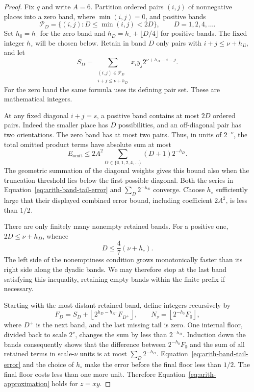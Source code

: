 \begin{proof}
Fix $q$ and write $A=6$.  Partition ordered pairs $(i,j)$ of
nonnegative places into a zero band, where $\min(i,j)=0$, and
positive bands
\[
 \mathcal P_D=\{(i,j):D\leq\min(i,j)<2D\},
 \qquad D=1,2,4,\ldots.
\]
Set $h_0=h_\circ$ for the zero band and
$h_D=h_\circ+\lfloor D/4\rfloor$ for positive bands.  The fixed
integer $h_\circ$ will be chosen below.  Retain in band $D$ only
pairs with $i+j\leq \nu+h_D$, and let
\begin{equation}
 S_D=\sum_{\substack{(i,j)\in\mathcal P_D\\i+j\leq \nu+h_D}}
           x_i y_j2^{\nu+h_D-i-j}.
 \label{eq:arith-band-integer}
\end{equation}
For the zero band the same formula uses its defining pair set.
These are mathematical integers.

At any fixed diagonal $i+j=s$, a positive band contains at most
$2D$ ordered pairs.  Indeed the smaller place has $D$ possibilities,
and an off-diagonal pair has two orientations.  The zero band has
at most two pairs.  Thus, in units of $2^{-\nu}$, the total omitted
product terms have absolute sum at most
\begin{equation}
 E_{\mathrm{omit}}
 \leq 2A^2\sum_{D\in\{0,1,2,4,\ldots\}}(D+1)2^{-h_D}.
 \label{eq:arith-band-tail-error}
\end{equation}
The geometric summation of the diagonal weights gives this bound
also when the truncation threshold lies below the first possible
diagonal.  Both the series in Equation~\eqref{eq:arith-band-tail-error}
and $\sum_D2^{-h_D}$ converge.  Choose $h_\circ$ sufficiently large
that their displayed combined error bound, including coefficient
$2A^2$, is less than $1/2$.

There are only finitely many nonempty retained bands.  For a
positive one, $2D\leq \nu+h_D$, whence
\begin{equation}
 D\leq\frac47(\nu+h_\circ).
 \label{eq:arith-last-band}
\end{equation}
The left side of the nonemptiness condition grows monotonically
faster than its right side along the dyadic bands.  We may therefore
stop at the last band satisfying this inequality, retaining empty
bands within the finite prefix if necessary.

Starting with the most distant retained band, define integers
recursively by
\begin{equation}
 F_D=S_D+
       \left\lfloor 2^{h_D-h_{D^+}}F_{D^+}\right\rfloor,
 \qquad
 N_\nu=\left\lfloor2^{-h_0}F_0\right\rfloor,
 \label{eq:arith-band-recursion}
\end{equation}
where $D^+$ is the next band, and the last missing tail is zero.
One internal floor, divided back to scale $2^\nu$, changes the sum
by less than $2^{-h_D}$.  Induction down the bands consequently
shows that the difference between $2^{-h_0}F_0$ and the sum of
all retained terms in scale-$\nu$ units is at most $\sum_D2^{-h_D}$.
Equation~\eqref{eq:arith-band-tail-error} and the choice of
$h_\circ$ make the error before the final floor less than $1/2$.
The final floor costs less than one more unit.  Therefore
Equation~\eqref{eq:arith-approximation} holds for $z=xy$.


\end{proof}
